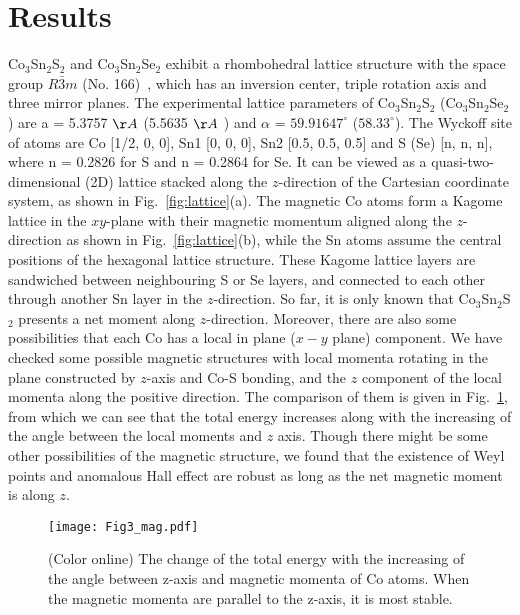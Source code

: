 \documentclass[aps,prb,reprint,superscriptaddress,amssymb,amsmath]{revtex4-1}
\begin{document}
\section{Results}
Co$_3$Sn$_2$S$_2$ and Co$_3$Sn$_2$Se$_2$ exhibit a rhombohedral lattice structure with 
the space group $R\bar{3}m$ (No. 166)~\cite{Sakai_2013,Weihrich_2015},
which has an inversion center, triple rotation axis and three mirror planes. 
The experimental lattice parameters of Co$_3$Sn$_2$S$_2$ (Co$_3$Sn$_2$Se$_2$) are 
a = 5.3757 $\AA$ (5.5635 $\AA$ ) and $\alpha$ = ${59.91647}^{\circ}$ (${58.33}^{\circ}$).
The Wyckoff site of atoms are Co [1/2, 0, 0], Sn1 [0, 0, 0], Sn2 [0.5, 0.5, 0.5] and S (Se) [n, n, n], where n = 0.2826 for S and n = 0.2864 for Se.
It can be viewed as a quasi-two-dimensional (2D) lattice stacked along the $z$-direction of the Cartesian coordinate system, 
as shown in Fig.~\ref{fig:lattice}(a). 
The magnetic Co atoms form a Kagome lattice in the $xy$-plane with their magnetic momentum aligned along the $z$-direction as shown in Fig.~\ref{fig:lattice}(b), 
while the Sn atoms assume the central positions of the hexagonal lattice structure. 
These Kagome lattice layers are sandwiched between neighbouring S or Se layers, 
and connected to each other through another Sn layer in the $z$-direction. 
So far, it is only known that Co$_3$Sn$_2$S$_2$ presents a net moment along $z$-direction.
Moreover, there are also some possibilities that each Co has a local in plane ($x-y$ plane) 
component. We have checked some possible magnetic structures with local momenta rotating
in the plane constructed by $z$-axis and Co-S bonding, and the $z$ component
of the local momenta along the positive direction. The comparison of them is
given in Fig.~\ref{fig:mag}, from which we can see that the total energy increases along
with the increasing of the angle between the local moments and $z$ axis.
Though there might be some other possibilities of the magnetic structure, we found that 
the existence of Weyl points and anomalous Hall effect are robust as long as the net      
magnetic moment is along $z$.

\begin{figure}[htb]
\centering
\texttt{[image: Fig3\_mag.pdf]}
   \caption{
(Color online) The change of the total energy with the increasing of the angle between z-axis and magnetic momenta of Co atoms.
When the magnetic momenta are parallel to the z-axis, it is most stable.}
\label{fig:mag}
\end{figure}
\end{document}
